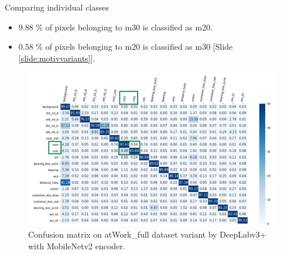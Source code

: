 \documentclass{beamer}
\begin{document}
\begin{frame}{Comparing individual classes}

	\begin{small}
		\begin{itemize}
			\item 9.88 \% of pixels belonging to m30 is classified as m20. 
			\item 0.58 \% of pixels belonging to m20 is classified as m30 [Slide \ref{slide:motivvariants}].
		\end{itemize}
	\end{small}		
	
	\begin{figure}[h]
		\centering
		\includegraphics[width=0.70\linewidth]{images/cm_full}
		\captionsetup{justification=centering,margin=0.2cm}
		\caption{Confusion matrix on atWork\_full dataset variant by DeepLabv3+ with MobileNetv2 encoder.}
		\label{Fig:variants}
	\end{figure}

\end{frame}
\end{document}
